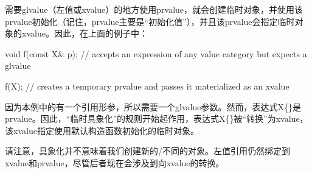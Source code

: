 需要glvalue（左值或xvalue）的地方使用prvalue，就会创建临时对象，并使用该prvalue初始化（记住，prvalue主要是“初始化值”），并且该prvalue会指定临时对象的xvalue。因此，在上面的例子中：

\begin{cppcode}
void f(const X& p); // accepts an expression of any value category but expects a glvalue

f(X{}); // creates a temporary prvalue and passes it materialized as an xvalue
\end{cppcode}

因为本例中的有一个引用形参，所以需要一个glvalue参数。然而，表达式X\{\}是prvalue。因此，“临时具象化”的规则开始起作用，表达式X\{\}被“转换”为xvalue，该xvalue指定使用默认构造函数初始化的临时对象。

请注意，具象化并不意味着我们创建新的/不同的对象。左值引用仍然绑定到xvalue和prvalue，尽管后者现在会涉及到向xvalue的转换。






